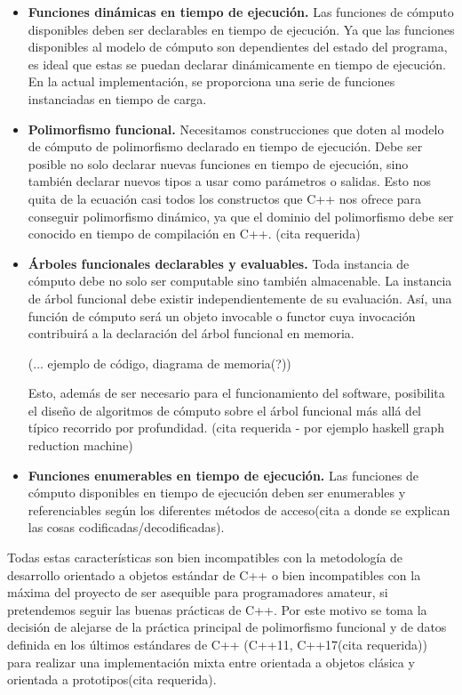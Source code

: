 \begin{itemize}
    \item \textbf{Funciones dinámicas en tiempo de ejecución.} Las funciones de cómputo disponibles deben ser declarables en tiempo de ejecución. Ya que las funciones disponibles al modelo de cómputo son dependientes del estado del programa, es ideal que estas se puedan declarar dinámicamente en tiempo de ejecución. En la actual implementación, se proporciona una serie de funciones instanciadas en tiempo de carga.
    
    \item \textbf{Polimorfismo funcional.} Necesitamos construcciones que doten al modelo de cómputo de polimorfismo declarado en tiempo de ejecución. Debe ser posible no solo declarar nuevas funciones en tiempo de ejecución, sino también declarar nuevos tipos a usar como parámetros o salidas. Esto nos quita de la ecuación casi todos los constructos que C++ nos ofrece para conseguir polimorfismo dinámico, ya que el dominio del polimorfismo debe ser conocido en tiempo de compilación en C++. (cita requerida)
    
    \item \textbf{Árboles funcionales declarables y evaluables.} Toda instancia de cómputo debe no solo ser computable sino también almacenable. La instancia de árbol funcional debe existir independientemente de su evaluación. Así, una función de cómputo será un objeto invocable o functor cuya invocación contribuirá a la declaración del árbol funcional en memoria.
    
    (... ejemplo de código, diagrama de memoria(?))

    Esto, además de ser necesario para el funcionamiento del software, posibilita el diseño de algoritmos de cómputo sobre el árbol funcional más allá del típico recorrido por profundidad. (cita requerida - por ejemplo haskell graph reduction machine)
    
    \item \textbf{Funciones enumerables en tiempo de ejecución.} Las funciones de cómputo disponibles en tiempo de ejecución deben ser enumerables y referenciables según los diferentes métodos de acceso(cita a donde se explican las cosas codificadas/decodificadas).
\end{itemize}

Todas estas características son bien incompatibles con la metodología de desarrollo orientado a objetos estándar de C++ o bien incompatibles con la máxima del proyecto de ser asequible para programadores amateur, si pretendemos seguir las buenas prácticas de C++. Por este motivo se toma la decisión de alejarse de la práctica principal de polimorfismo funcional y de datos definida en los últimos estándares de C++ (C++11, C++17(cita requerida)) para realizar una implementación mixta entre orientada a objetos clásica y orientada a prototipos(cita requerida). 

